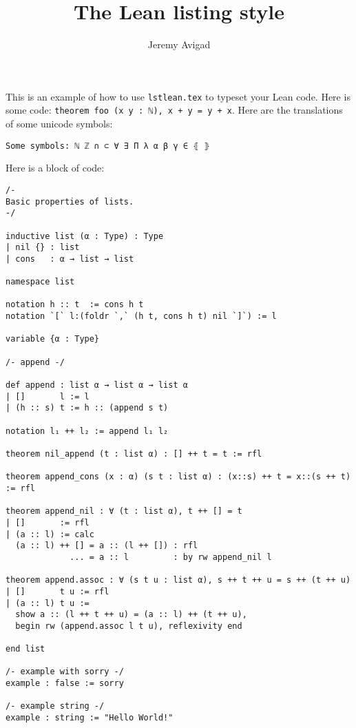 \documentclass{article}
\title{The Lean listing style}
\author{Jeremy Avigad}
\begin{document}
\maketitle

This is an example of how to use \verb=lstlean.tex= to typeset your Lean code. Here is some code: \lstinline{theorem foo (x y : ℕ), x + y = y + x}.  Here are the translations of some unicode symbols:
\begin{lstlisting}
Some symbols: ℕ ℤ ∩ ⊂ ∀ ∃ Π λ α β γ ∈ ⦃ ⦄
\end{lstlisting}
Here is a block of code:
\begin{lstlisting}
/-
Basic properties of lists.
-/

inductive list (α : Type) : Type
| nil {} : list
| cons   : α → list → list

namespace list

notation h :: t  := cons h t
notation `[` l:(foldr `,` (h t, cons h t) nil `]`) := l

variable {α : Type}

/- append -/

def append : list α → list α → list α
| []       l := l
| (h :: s) t := h :: (append s t)

notation l₁ ++ l₂ := append l₁ l₂

theorem nil_append (t : list α) : [] ++ t = t := rfl

theorem append_cons (x : α) (s t : list α) : (x::s) ++ t = x::(s ++ t) := rfl

theorem append_nil : ∀ (t : list α), t ++ [] = t
| []       := rfl
| (a :: l) := calc
  (a :: l) ++ [] = a :: (l ++ []) : rfl
             ... = a :: l         : by rw append_nil l

theorem append.assoc : ∀ (s t u : list α), s ++ t ++ u = s ++ (t ++ u)
| []       t u := rfl
| (a :: l) t u :=
  show a :: (l ++ t ++ u) = (a :: l) ++ (t ++ u),
  begin rw (append.assoc l t u), reflexivity end

end list

/- example with sorry -/
example : false := sorry

/- example string -/
example : string := "Hello World!"
\end{lstlisting}
\end{document}
